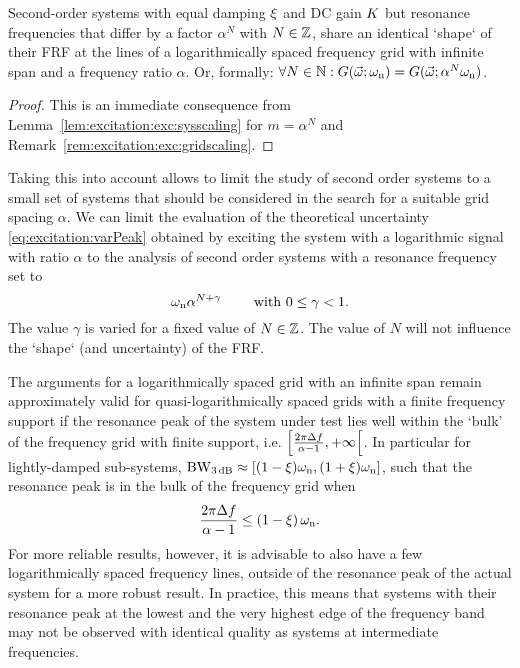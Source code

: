   \begin{theorem}
    Second-order  systems with equal damping $\xi_{}$ and \gls{DC} gain $K_{}$ but resonance frequencies that differ by a factor $\alpha^N$ with $N \in \mathbb{Z}$, share an identical `shape` of their \gls{FRF} at the lines of a logarithmically spaced frequency grid with infinite span and a frequency ratio $\alpha$.
    Or, formally: $\forall N \in \mathbb{N}: G(\vec{\omega};\omega_{\mathrm{n}}) = G(\vec{\omega}; \alpha^{N}\omega_{\mathrm{n}})$.
  \end{theorem}
  \begin{proof}
    This is an immediate consequence from Lemma~\ref{lem:excitation:exc:sysscaling} for $m= \alpha^{N}$ and Remark~\ref{rem:excitation:exc:gridscaling}.
  \end{proof}

  Taking this into account allows to limit the study of second order systems to a small set of systems that should be considered in the search for a suitable grid spacing $\alpha$.
  We can limit the evaluation of the theoretical uncertainty \eqref{eq:excitation:varPeak} obtained by exciting the system with a logarithmic signal with ratio $\alpha$ to the analysis of second order systems with a resonance frequency set to
  \begin{equation}
    \omega_{\mathrm{n}} \alpha^{N+\gamma}\qquad \text{ with } 0 \leq \gamma < 1\text{.}
    \label{eq:excitation:theoreticalBestVariationOmega}
  \end{equation}
  The value $\gamma$ is varied for a fixed value of $N \in \mathbb{Z}$.
  The value of $N$ will not influence the `shape` (and uncertainty) of the FRF.

  The arguments for a logarithmically spaced grid with an infinite span remain approximately valid for quasi-logarithmically spaced grids with a finite frequency support if the resonance peak of the system under test lies well within the `bulk' of the frequency grid with finite support, i.e. $\left[ \frac{2\pi \Delta f}{\alpha - 1}, +\infty \right[$.
  In particular for lightly-damped sub-systems, $\mathrm{BW}_{3\,\mathrm{dB}} \approx \left[ (1-\xi_{})\omega_{\mathrm{n}}, (1+\xi_{})\omega_{\mathrm{n}} \right]$, such that the resonance peak is in the bulk of the frequency grid when
  \begin{equation} 
    \frac{2 \pi \Delta f}{\alpha -1} \leq \left( 1 - \xi_{} \right) \omega_{\mathrm{n}}
    \text{.}
    \label{eq:excitation:systemInBulk:generic}
  \end{equation}
  For more reliable results, however, it is advisable to also have a few logarithmically spaced frequency lines, outside of the resonance peak of the actual system for a more robust result.
  In practice, this means that systems with their resonance peak at the lowest and the very highest edge of the frequency band may not be observed with identical quality as systems at intermediate frequencies.


